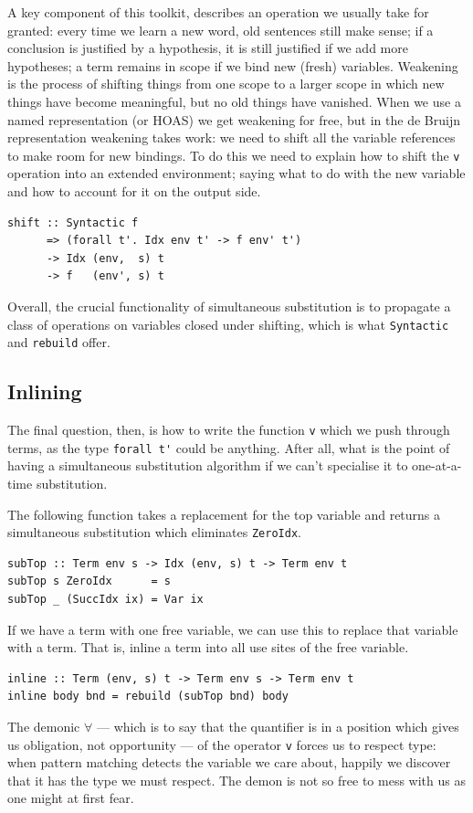 A key component of this toolkit,  describes an operation we
usually take for granted: every time we learn a new word, old sentences still
make sense; if a conclusion is justified by a hypothesis, it is still justified
if we add more hypotheses; a term remains in scope if we bind new (fresh)
variables. Weakening is the process of shifting things from one scope to a
larger scope in which new things have become meaningful, but no old things have
vanished. When we use a named representation (or HOAS) we get weakening
for free, but in the de Bruijn representation weakening takes
work: we need to shift all the variable references to make room for new
bindings. To do this we need to explain how to shift the \texttt{v} operation
into an extended environment; saying what to do with the new variable and how to
account for it on the output side.
%
\begin{lstlisting}[style=haskell]
shift :: Syntactic f
      => (forall t'. Idx env t' -> f env' t')
      -> Idx (env,  s) t
      -> f   (env', s) t
\end{lstlisting}
%
Overall, the crucial functionality of simultaneous substitution is to propagate
a class of operations on variables closed under shifting, which is what
\texttt{Syntactic} and \texttt{rebuild} offer.


\subsection{Inlining}

The final question, then, is how to write the function \texttt{v} which we push
through terms, as the type \lstinline[style=inline]{forall t'} could be anything. After all,
what is the point of having a simultaneous substitution algorithm if we can't
specialise it to one-at-a-time substitution.

The following function takes a replacement for the top variable and returns a
simultaneous substitution which eliminates \texttt{ZeroIdx}.
%
\begin{lstlisting}[style=haskell]
subTop :: Term env s -> Idx (env, s) t -> Term env t
subTop s ZeroIdx      = s
subTop _ (SuccIdx ix) = Var ix
\end{lstlisting}
%
If we have a term with one free variable, we can use this to replace that
variable with a term. That is, inline a term into all use sites of the free
variable.
%
\begin{lstlisting}[style=haskell,firstnumber=last,caption={A simultaneous substitution to inline terms}]
inline :: Term (env, s) t -> Term env s -> Term env t
inline body bnd = rebuild (subTop bnd) body
\end{lstlisting}
%
The demonic $\forall$ --- which is to say that the quantifier is in a position
which gives us obligation, not opportunity --- of the operator \texttt{v} forces
us to respect type: when pattern matching detects the variable we care about,
happily we discover that it has the type we must respect. The demon is not so
free to mess with us as one might at first fear.

